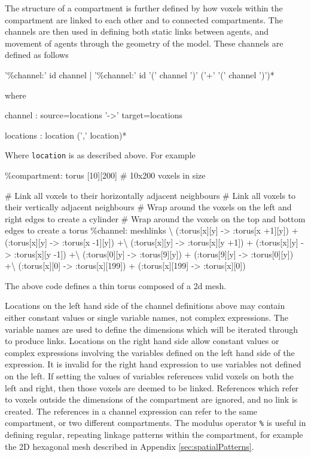 The structure of a compartment is further defined by how voxels within the compartment are linked to each other and to connected compartments. The channels are then used in defining both static links between agents, and movement of agents through the geometry of the model. These channels are defined as follows
\begin{bnfsource}
'\%channel:' id channel
| '\%channel:' id '(' channel ')' ('+' '(' channel ')')*
\end{bnfsource}
where
\begin{bnfsource}
channel :
  source=locations '->' target=locations

locations :
  location (',' location)*
\end{bnfsource}
Where \verb|location| is as described above. For example
\begin{kappasource}
\%compartment: torus [10][200]    # 10x200 voxels in size

# Link all voxels to their horizontally adjacent neighbours
# Link all voxels to their vertically adjacent neighbours
# Wrap around the voxels on the left and right edges to create a cylinder
# Wrap around the voxels on the top and bottom edges to create a torus
\%channel: meshlinks {\textbackslash}
    (:torus[x][y] -> :torus[x +1][y]) + (:torus[x][y] -> :torus[x -1][y]) +{\textbackslash}
    (:torus[x][y] -> :torus[x][y +1]) + (:torus[x][y] -> :torus[x][y -1]) +{\textbackslash}
    (:torus[0][y] -> :torus[9][y])   + (:torus[9][y] -> :torus[0][y]) +{\textbackslash}
    (:torus[x][0] -> :torus[x][199]) + (:torus[x][199] -> :torus[x][0])
\end{kappasource}

The above code defines a thin torus composed of a 2d mesh.

Locations on the left hand side of the channel definitions above may contain either constant values or single variable names, not complex expressions. The variable names are used to define the dimensions which will be iterated through to produce links. Locations on the right hand side allow constant values or complex expressions involving the variables defined on the left hand side of the expression. It is invalid for the right hand expression to use variables not defined on the left. If setting the values of variables references valid voxels on both the left and right, then those voxels are deemed to be linked. References which refer to voxels outside the dimensions of the compartment are ignored, and no link is created. The references in a channel expression can refer to the same compartment, or two different compartments. The modulus operator \verb|%| is useful in defining regular, repeating linkage patterns within the compartment, for example the 2D hexagonal mesh described in Appendix \ref{sec:spatialPatterns}.

